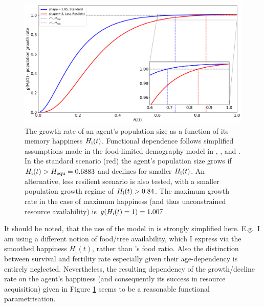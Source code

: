 \begin{figure}
	\centering
	\includegraphics[width=\textwidth]{images/populationchange_g}
	\caption{The growth rate of an agent's population size as a function of its memory happiness $H_{\rm i}(t)$. Functional dependence follows simplified assumptions made in the food-limited demography model in \citet{Lee2008}, \citet{Puleston2008}, and \citet{Puleston2017}. In the standard scenario (red) the agent's population size grows if $H_{\rm i}(t)>H_{\rm equ}=0.6883$ and declines for smaller $H_{\rm i}(t)$. An alternative, less resilient scenario is also tested, with a smaller population growth regime of $H_{\rm i}(t)>0.84$. The maximum growth rate in the case of maximum happiness (and thus unconstrained resource availability) is $g(H_{\rm i}(t)=1)=1.007$.}
	\label{fig:growthrate}
\end{figure}
It should be noted, that the use of the model in \citet{Puleston2017} is strongly simplified here.
E.g.\ I am using a different notion of food/tree availability, which I express via the smoothed happiness $H_\text{i}(t)$, rather than \citet{Puleston2017}'s food ratio.
Also the distinction between survival and fertility rate especially given their age-dependency is entirely neglected.
Nevertheless, the resulting dependency of the growth/decline rate on the agent's happiness (and consequently its success in resource acquisition) given in Figure \ref{fig:growthrate} seems to be a reasonable functional parametrisation. 


